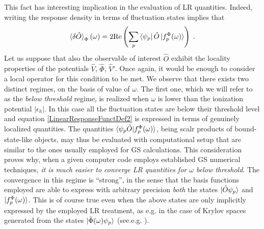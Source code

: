 \documentclass[reprint,aps,prb]{revtex4-1}
\newcommand{\eps}{\epsilon}
\newcommand{\be}{\begin{equation}}
\newcommand{\ee}{\end{equation}}
\newcommand{\lb}{\label}
\newcommand{\op}[1]{\hat {#1}}
\begin{document}
This fact has interesting implication in the evaluation of LR quantities.
%
% 
%
Indeed, writing the response 
density in terms of fluctuation states implies that 
\be\lb{LinearResponseFunctDef2}
\braket{\delta\op O}_\Phi(\omega) = 2\mathrm{Re} \left(\sum_p \bra{\psi_p}\op O\ket{f_p^\Phi(\omega)}\right) \;.
\ee
Let us suppose that also the observable of interest $\op O$ exhibit the locality properties of the potentials $ \op V$, $\op \Phi$, $\op V'$.
Once again, it would be enough to consider a local operator for this condition to be met.
We observe that there exists two 
distinct regimes, on the basis of value of $\omega$. 
The first one, which we will refer to as the \emph{below threshold} regime, is realized when
$\omega$ is lower than the ionization potential $|\eps_h|$.
In this case all the fluctuation states are below their threshold level and equation \eqref{LinearResponseFunctDef2} 
is expressed in terms of genuinely localized 
quantities. The quantities $\braket{\psi_p \op O| f_p^\Phi(\omega)}$, 
being scalr products of bound-state-like objects, may thus be evaluated with computational setup that
are similar to the ones usually employed for GS calculations.
This consideration proves why, when a given computer code employs established GS numerical techniques, 
\emph{it is much easier to converge LR quantities for $\omega$ below threshold}.
The convergence in this regime is ``strong'', in the sense that the basis functions employed are able to express 
with arbitrary precision \emph{both} the states $\ket{\op O \psi_p}$ and $\ket{f_p^\Phi(\omega)}$.
This is of course true even when the above states are only implicitly expressed by the employed LR treatment,
 as e.g. in the case of Krylov spaces generated from the states $\ket{\op\Phi(\omega) \psi_p}$ (see.e.g. \cite{baroni2008,linlinKPM}).


\end{document}
